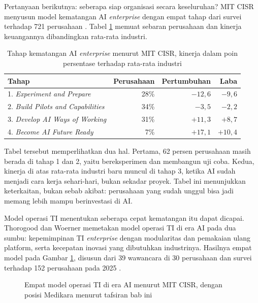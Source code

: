 Pertanyaan berikutnya: seberapa siap organisasi secara keseluruhan? MIT CISR
menyusun model kematangan AI \textit{enterprise} dengan empat tahap dari survei
terhadap 721 perusahaan \cite{c10-weill2024}. Tabel
\ref{tab:ch10-kematangan-ai} memuat sebaran perusahaan dan kinerja keuangannya
dibandingkan rata-rata industri.

\begin{table}[!htb]
  \centering
  \caption{Tahap kematangan AI \textit{enterprise} menurut MIT CISR, kinerja
           dalam poin persentase terhadap rata-rata industri}
  \label{tab:ch10-kematangan-ai}
  \small
  \begin{tabularx}{\textwidth}{Xrrr}
    \hline
    \textbf{Tahap} & \textbf{Perusahaan} & \textbf{Pertumbuhan} & \textbf{Laba} \\
    \hline
    1. \textit{Experiment and Prepare} & 28\% & $-12{,}6$ & $-9{,}6$ \\
    \hline
    2. \textit{Build Pilots and Capabilities} & 34\% & $-3{,}5$ & $-2{,}2$ \\
    \hline
    3. \textit{Develop AI Ways of Working} & 31\% & $+11{,}3$ & $+8{,}7$ \\
    \hline
    4. \textit{Become AI Future Ready} & 7\% & $+17{,}1$ & $+10{,}4$ \\
    \hline
  \end{tabularx}
\end{table}

Tabel tersebut memperlihatkan dua hal. Pertama, 62 persen perusahaan masih
berada di tahap 1 dan 2, yaitu bereksperimen dan membangun uji coba. Kedua,
kinerja di atas rata-rata industri baru muncul di tahap 3, ketika AI sudah
menjadi cara kerja sehari-hari, bukan sekadar proyek. Tabel ini menunjukkan
keterkaitan, bukan sebab akibat: perusahaan yang sudah unggul bisa jadi
memang lebih mampu berinvestasi di AI.

Model operasi TI menentukan seberapa cepat kematangan itu dapat dicapai.
Thorogood dan Woerner memetakan model operasi TI di era AI pada dua sumbu:
kepemimpinan TI \textit{enterprise} dengan modularitas dan pemakaian ulang
platform, serta kecepatan inovasi yang dibutuhkan industrinya. Hasilnya empat
model pada Gambar \ref{fig:ch10-model-operasi}, disusun dari 39 wawancara di 30
perusahaan dan survei terhadap 152 perusahaan pada 2025 \cite{thorogood2025}.

\begin{figure}[!htb]
  \centering
  
  \caption{Empat model operasi TI di era AI menurut MIT CISR, dengan posisi
           Medikara menurut tafsiran bab ini}
  \label{fig:ch10-model-operasi}
\end{figure}

